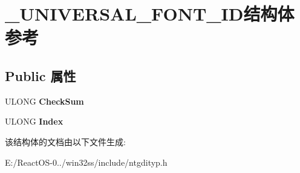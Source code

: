 \hypertarget{struct___u_n_i_v_e_r_s_a_l___f_o_n_t___i_d}{}\section{\+\_\+\+U\+N\+I\+V\+E\+R\+S\+A\+L\+\_\+\+F\+O\+N\+T\+\_\+\+I\+D结构体 参考}
\label{struct___u_n_i_v_e_r_s_a_l___f_o_n_t___i_d}
\subsection*{Public 属性}
\begin{DoxyCompactItemize}
\item 
\mbox{\label{struct___u_n_i_v_e_r_s_a_l___f_o_n_t___i_d_ab1e2a08d440a0568cf3f196076188127}} 
U\+L\+O\+NG {\bfseries Check\+Sum}
\item 
\mbox{\label{struct___u_n_i_v_e_r_s_a_l___f_o_n_t___i_d_acd28fb85bf72eb173e90b8b2d7d09acd}} 
U\+L\+O\+NG {\bfseries Index}
\end{DoxyCompactItemize}


该结构体的文档由以下文件生成\+:\begin{DoxyCompactItemize}
\item 
E\+:/\+React\+O\+S-\/0../win32ss/include/ntgdityp.\+h\end{DoxyCompactItemize}
